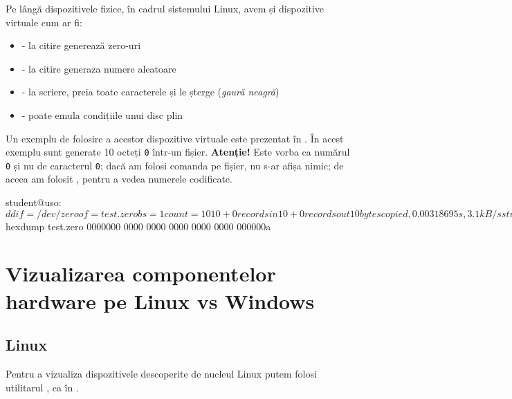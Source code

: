 Pe lângă dispozitivele fizice, în cadrul sistemului Linux, avem și dispozitive virtuale cum ar fi:

\begin{itemize}
  \item {} - la citire generează zero-uri
  \item {} - la citire generaza numere aleatoare
  \item {} - la scriere, preia toate caracterele și le
    șterge (\textit{gaură neagră})
  \item {} - poate emula condițiile unui disc plin
\end{itemize}

Un exemplu de folosire a acestor dispozitive virtuale este prezentat în . În acest exemplu sunt generate 10 octeți \texttt{0} într-un fișier. \textbf{Atenție!} Este vorba ca numărul \texttt{0} și nu de caracterul \texttt{0}; dacă am folosi comanda  pe fișier, nu s-ar afișa nimic; de aceea am folosit
, pentru a vedea numerele codificate.

\begin{screen}[caption={Folosirea dispozitivelor virtuale},label={lst:hw:copy-dev-zero}]
student@uso:~$ dd if=/dev/zero of=test.zero bs=1 count=10
10+0 records in
10+0 records out
10 bytes copied, 0.00318695 s, 3.1 kB/s
student@uso:~$ hexdump test.zero
0000000 0000 0000 0000 0000 0000
000000a
\end{screen}

\section{Vizualizarea componentelor hardware pe Linux vs Windows}
\label{sec:hw:view}

\subsection{Linux}
\label{sec:hw:view:linux}

Pentru a vizualiza dispozitivele descoperite de nucleul Linux putem folosi utilitarul , ca în .


